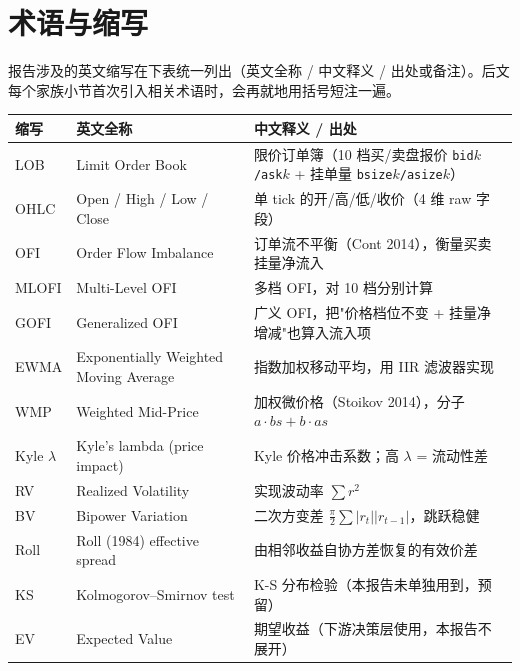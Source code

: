 \documentclass[10.5pt,a4paper]{article}
\begin{document}
\section{术语与缩写}
\label{sec:glossary}

报告涉及的英文缩写在下表统一列出（英文全称 / 中文释义 / 出处或备注）。后文每个家族小节首次引入相关术语时，会再就地用括号短注一遍。

\begin{table}[H]
\centering\footnotesize
\setlength{\tabcolsep}{4pt}
\renewcommand{\arraystretch}{1.12}
\begin{tabularx}{\linewidth}{l l >{\raggedright\arraybackslash}X}
\toprule
\textbf{缩写} & \textbf{英文全称} & \textbf{中文释义 / 出处} \\
\midrule
LOB     & Limit Order Book                          & 限价订单簿（10 档买/卖盘报价 \texttt{bid$k$/ask$k$} + 挂单量 \texttt{bsize$k$/asize$k$}） \\
OHLC    & Open / High / Low / Close                 & 单 tick 的开/高/低/收价（4 维 raw 字段） \\
OFI     & Order Flow Imbalance                      & 订单流不平衡（Cont 2014），衡量买卖挂量净流入 \\
MLOFI   & Multi-Level OFI                           & 多档 OFI，对 10 档分别计算 \\
GOFI    & Generalized OFI                           & 广义 OFI，把"价格档位不变 + 挂量净增减"也算入流入项 \\
EWMA    & Exponentially Weighted Moving Average     & 指数加权移动平均，用 IIR 滤波器实现 \\
WMP     & Weighted Mid-Price                        & 加权微价格（Stoikov 2014），分子 $a \cdot bs + b \cdot as$ \\
Kyle $\lambda$ & Kyle's lambda (price impact)       & Kyle 价格冲击系数；高 $\lambda$ = 流动性差 \\
RV      & Realized Volatility                       & 实现波动率 $\sum r^2$ \\
BV      & Bipower Variation                         & 二次方变差 $\tfrac{\pi}{2}\sum|r_t||r_{t-1}|$，跳跃稳健 \\
Roll    & Roll (1984) effective spread              & 由相邻收益自协方差恢复的有效价差 \\
KS      & Kolmogorov--Smirnov test                  & K-S 分布检验（本报告未单独用到，预留） \\
EV      & Expected Value                            & 期望收益（下游决策层使用，本报告不展开） \\

\end{tabularx}
\end{table}
\end{document}
